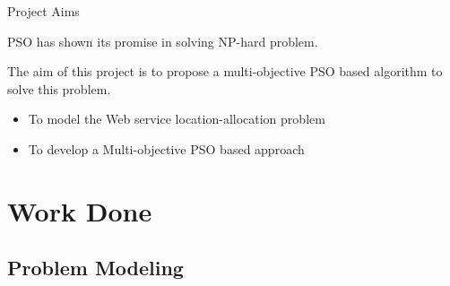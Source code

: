 \documentclass[10pt]{beamer}
\begin{document}
\begin{frame}{Project Aims}

PSO has shown its promise in solving NP-hard problem.

\hfill

The aim of this project is to propose a multi-objective PSO based algorithm to solve this problem.

\begin{itemize}
    \item To model the Web service location-allocation problem
    \item To develop a Multi-objective PSO based approach
  \end{itemize}
\end{frame}

\section{Work Done}
\subsection{Problem Modeling}
\end{document}
